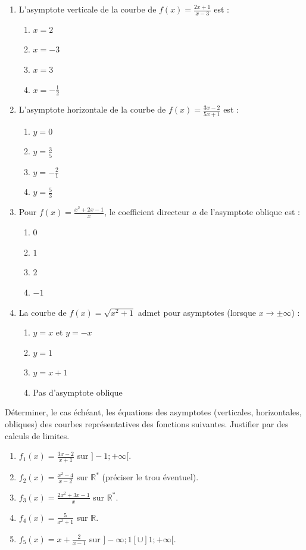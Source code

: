 \documentclass[11pt]{article}
\begin{document}
\begin{exercice}
\begin{enumerate}
    \item L'asymptote verticale de la courbe de $f(x) = \frac{2x+1}{x-3}$ est :
    \begin{enumerate}
        \item $x = 2$ \item $x = -3$ \item $x = 3$ \item $x = -\frac{1}{2}$
    \end{enumerate}
    \item L'asymptote horizontale de la courbe de $f(x) = \frac{3x-2}{5x+1}$ est :
    \begin{enumerate}
        \item $y = 0$ \item $y = \frac{3}{5}$ \item $y = -\frac{2}{1}$ \item $y = \frac{5}{3}$
    \end{enumerate}
    \item Pour $f(x) = \frac{x^2+2x-1}{x}$, le coefficient directeur $a$ de l'asymptote oblique est :
    \begin{enumerate}
        \item $0$ \item $1$ \item $2$ \item $-1$
    \end{enumerate}
    \item La courbe de $f(x) = \sqrt{x^2+1}$ admet pour asymptotes (lorsque $x \to \pm\infty$) :
    \begin{enumerate}
        \item $y = x$ et $y = -x$ \item $y = 1$ \item $y = x+1$ \item Pas d'asymptote oblique
    \end{enumerate}
\end{enumerate}
\end{exercice}

\begin{exercice}
Déterminer, le cas échéant, les équations des asymptotes (verticales, horizontales, obliques) des courbes représentatives des fonctions suivantes. Justifier par des calculs de limites.
\begin{enumerate}
    \item $f_1(x) = \frac{3x-2}{x+1}$ sur $]-1;+\infty[$.
    \item $f_2(x) = \frac{x^2-4}{x-2}$ sur $\mathbb{R}^*$ (préciser le trou éventuel).
    \item $f_3(x) = \frac{2x^2+3x-1}{x}$ sur $\mathbb{R}^*$.
    \item $f_4(x) = \frac{5}{x^2+1}$ sur $\mathbb{R}$.
    \item $f_5(x) = x + \frac{2}{x-1}$ sur $]-\infty;1[ \cup ]1;+\infty[$.
\end{enumerate}
\end{exercice}
\end{document}
